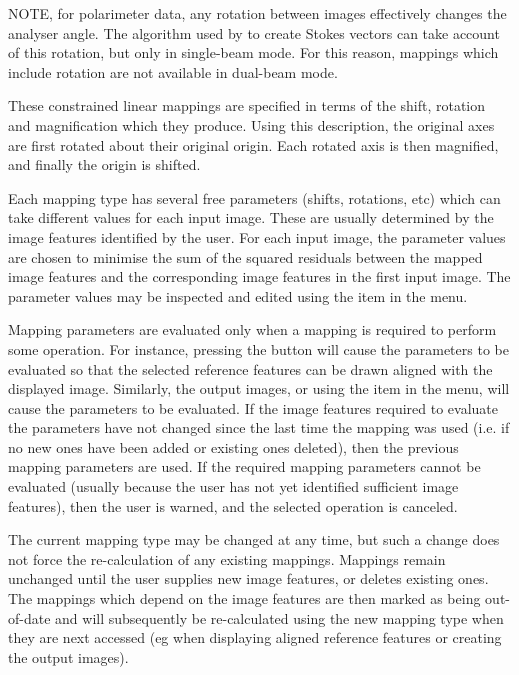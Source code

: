 \documentclass[11pt,nolof]{starlink}
\begin{document}
NOTE, for polarimeter data, any rotation between images
effectively changes the analyser angle. The algorithm used by
 to create Stokes vectors can take account
of this rotation, but only in single-beam mode. For this reason, mappings
which include rotation are not available in dual-beam mode.

These constrained linear mappings are specified in terms of the shift,
rotation and magnification which they produce. Using this description,
the original axes are first rotated about their original origin. Each
rotated axis is then magnified, and finally the origin is shifted.

Each mapping type has several free parameters (shifts, rotations, etc)
which can take different values for each input image. These are usually
determined by the image features identified by the user. For each input
image, the parameter values are chosen to minimise the sum of the squared
residuals between the mapped image features and the corresponding image
features in the first input image. The parameter values may be inspected
and edited using the  item
in the  menu.

Mapping parameters are evaluated only when a mapping is required to
perform some operation. For instance, pressing the  button will cause the parameters to be
evaluated so that the selected reference features can be drawn
aligned with the displayed image. Similarly, 
the output images, or using the 
item in the  menu, will cause the
parameters to be evaluated. If the image features required to evaluate
the parameters have not changed since the last time the mapping was used
(i.e. if no new ones have been added or existing ones deleted), then the
previous mapping parameters are used. If the required mapping parameters
cannot be evaluated (usually because the user has not yet identified
sufficient image features), then the user is warned, and the selected
operation is canceled.

The current mapping type may be changed at any time, but such a change
does not force the re-calculation of any existing mappings. Mappings
remain unchanged until the user supplies new image features, or deletes
existing ones. The mappings which depend on the image features are then
marked as being out-of-date and will subsequently be re-calculated using
the new mapping type when they are next accessed (eg when displaying
aligned reference features or creating the output images).
\end{document}
